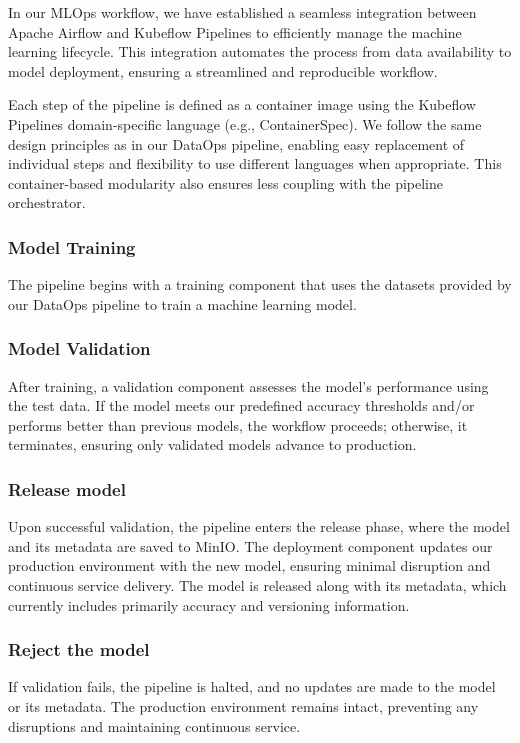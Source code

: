 In our MLOps workflow, we have established a seamless integration between Apache Airflow and Kubeflow Pipelines to
efficiently manage the machine learning lifecycle.
This integration automates the process from data availability to model deployment, ensuring a streamlined and reproducible workflow.

Each step of the pipeline is defined as a container image using the Kubeflow Pipelines domain-specific language (e.g., ContainerSpec).
We follow the same design principles as in our DataOps pipeline,
enabling easy replacement of individual steps and flexibility to use different languages when appropriate.
This container-based modularity also ensures less coupling with the pipeline orchestrator.

\subsubsection{Model Training}
The pipeline begins with a training component that uses the datasets provided by our DataOps pipeline to train a machine learning model.

\subsubsection{Model Validation}
After training, a validation component assesses the model's performance using the test data.
If the model meets our predefined accuracy thresholds and/or performs better than previous models,
the workflow proceeds; otherwise, it terminates, ensuring only validated models advance to production.

\subsubsection{Release model}
Upon successful validation, the pipeline enters the release phase, where the model and its metadata are saved to MinIO\@.
The deployment component updates our production environment with the new model, ensuring minimal disruption and continuous service delivery.
The model is released along with its metadata, which currently includes primarily accuracy and versioning information.

\subsubsection{Reject the model}
If validation fails, the pipeline is halted, and no updates are made to the model or its metadata.
The production environment remains intact, preventing any disruptions and maintaining continuous service.

